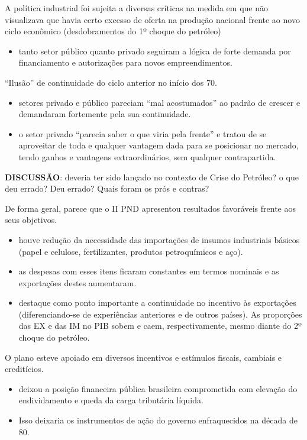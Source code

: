 \documentclass[a4paper,12pt]{article}[abntex2]
\begin{document}
A política industrial foi sujeita a diversas críticas na medida em que não visualizava que havia certo excesso de oferta na produção nacional frente ao novo ciclo econômico (desdobramentos do 1º choque do petróleo)\begin{itemize}
    \item tanto setor público quanto privado seguiram a lógica de forte demanda por financiamento e autorizações para novos empreendimentos.
\end{itemize}
    
“Ilusão” de continuidade do ciclo anterior no início dos 70. \begin{itemize}
    \item setores privado e público pareciam “mal acostumados” ao padrão de crescer e demandaram fortemente pela sua continuidade. 
    \item o setor privado “parecia saber o que viria pela frente” e tratou de se aproveitar de toda e qualquer vantagem dada para se posicionar no mercado, tendo ganhos e vantagens extraordinários, sem qualquer contrapartida.
\end{itemize}

\textbf{DISCUSSÃO}: deveria ter sido lançado no contexto de Crise do Petróleo? o que deu errado? Deu errado? Quais foram os prós e contras?

De forma geral, parece que o II PND apresentou resultados favoráveis frente aos seus objetivos. \begin{itemize}
    \item houve redução da necessidade das importações de insumos industriais básicos (papel e celulose, fertilizantes, produtos petroquímicos e aço). 
    \item as despesas com esses itens ficaram constantes em termos nominais e as exportações destes aumentaram.
    \item destaque como ponto importante a continuidade no incentivo às exportações (diferenciando-se de experiências anteriores e de outros países). As proporções das EX e das IM no PIB sobem e caem, respectivamente, mesmo diante do 2º choque do petróleo.
\end{itemize}

O plano esteve apoiado em diversos incentivos e estímulos fiscais, cambiais e creditícios. \begin{itemize}
    \item deixou a posição financeira pública brasileira comprometida com elevação do endividamento e queda da carga tributária líquida.
    \item Isso deixaria os instrumentos de ação do governo enfraquecidos na década de 80.
\end{itemize}
\end{document}
